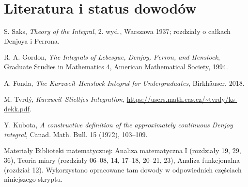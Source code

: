 \providecommand{\atlasref}[2]{#2}
\section*{Literatura i status dowodów}
\begin{enumerate}[label={[\arabic*]},leftmargin=*]
\item S. Saks, \emph{Theory of the Integral}, 2. wyd., Warszawa 1937; rozdziały o całkach Denjoya i Perrona.
\item R. A. Gordon, \emph{The Integrals of Lebesgue, Denjoy, Perron, and Henstock}, Graduate Studies in Mathematics 4, American Mathematical Society, 1994.
\item A. Fonda, \emph{The Kurzweil--Henstock Integral for Undergraduates}, Birkh\"{a}user, 2018.
\item M. Tvrd\'{y}, \emph{Kurzweil--Stieltjes Integration}, \url{https://users.math.cas.cz/~tvrdy/ks-dekk.pdf}.
\item Y. Kubota, \emph{A constructive definition of the approximately continuous Denjoy integral}, Canad. Math. Bull. 15 (1972), 103--109.
\item Materiały Biblioteki matematycznej: Analiza matematyczna I (rozdziały 19, 29, 36), Teoria miary (rozdziały 06--08, 14, 17--18, 20--21, 23), Analiza funkcjonalna (rozdział 12). Wykorzystano opracowane tam dowody w odpowiednich częściach niniejszego skryptu.
\end{enumerate}

